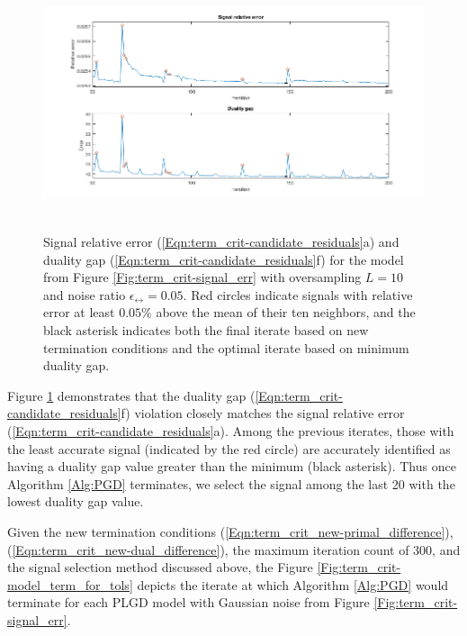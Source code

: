 \begin{figure}[H]
\centering
\hbox{\hspace{-1.7cm} \includegraphics[scale=0.6]{term_crit-duality_gap} }
\caption{Signal relative error (\ref{Eqn:term_crit-candidate_residuals}a) and duality gap (\ref{Eqn:term_crit-candidate_residuals}f) for the model from Figure \ref{Fig:term_crit-signal_err} with oversampling $L = 10$ and noise ratio $\epsilon_\rel = 0.05$. Red circles indicate signals with relative error at least $0.05\%$ above the mean of their ten neighbors, and the black asterisk indicates both the final iterate based on new termination conditions and the optimal iterate based on minimum duality gap.}
\label{Fig:term_crit-duality_gap}
\end{figure}




Figure \ref{Fig:term_crit-duality_gap} demonstrates that the duality gap (\ref{Eqn:term_crit-candidate_residuals}f) violation closely matches the signal relative error (\ref{Eqn:term_crit-candidate_residuals}a).  Among the previous iterates, those with the least accurate signal (indicated by the red circle) are accurately identified as having a duality gap value greater than the minimum (black asterisk).  Thus once Algorithm \ref{Alg:PGD} terminates, we select the signal among the last 20 with the lowest duality gap value.








Given the new termination conditions (\ref{Eqn:term_crit_new-primal_difference}), (\ref{Eqn:term_crit_new-dual_difference}), the maximum iteration count of 300, and the signal selection method discussed above, the Figure \ref{Fig:term_crit-model_term_for_tols} depicts the iterate at which Algorithm \ref{Alg:PGD} would terminate for each PLGD model with Gaussian noise from Figure \ref{Fig:term_crit-signal_err}.

